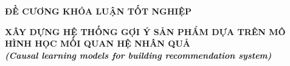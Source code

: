 \documentclass{article}[14pt]
\begin{document}
    \begin{figure}[h]
        \begin{floatrow}
        {%
    
        }
        {%
    
        }
        \end{floatrow}
    \end{figure}
    
    \begin{center}
        
        \textbf{\Large ĐỀ CƯƠNG KHÓA LUẬN TỐT NGHIỆP} \\ 
    \end{center}
    
    
    \begin{center}
        
        \textbf{\huge XÂY DỰNG HỆ THỐNG GỢI Ý SẢN PHẨM DỰA TRÊN MÔ HÌNH HỌC MỐI QUAN HỆ NHÂN QUẢ} 
        \\
        
    \vspace{.5cm}
        \textit{\textbf{\Large (Causal learning models for building recommendation system)}}
    \end{center}
    
\end{document}
